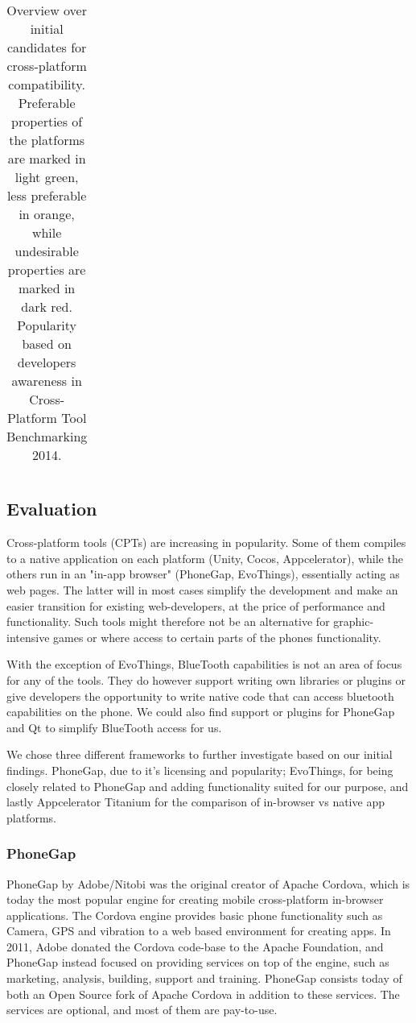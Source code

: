 \begin{landscape}
\begin{table}[ht]
\begin{minipage}{\textwidth}
\begin{tabular}{llllll}
\end{tabular}
\caption {Overview over initial candidates for cross-platform compatibility. Preferable properties of the platforms are marked in light green, less preferable in orange, while undesirable properties are marked in dark red. Popularity based on developers awareness in Cross-Platform Tool Benchmarking 2014\cite{research2guidance_cpt_benchmark2014}.}
\end{minipage}
\end{table}
\end{landscape}

\subsection{Evaluation}
Cross-platform tools (CPTs) are increasing in popularity. Some of them compiles to a native application on each platform (Unity, Cocos, Appcelerator), while the others run in an "in-app browser" (PhoneGap, EvoThings), essentially acting as web pages. The latter will in most cases simplify the development and make an easier transition for existing web-developers, at the price of performance and functionality. Such tools might therefore not be an alternative for graphic-intensive games or where access to certain parts of the phones functionality. 

With the exception of EvoThings, BlueTooth capabilities is not an area of focus for any of the tools. They do however support writing own libraries or plugins or give developers the opportunity to write native code that can access bluetooth capabilities on the phone. We could also find support or plugins for PhoneGap and Qt to simplify BlueTooth access for us.

We chose three different frameworks to further investigate based on our initial findings. PhoneGap, due to it's licensing and popularity; EvoThings, for being closely related to PhoneGap and adding functionality suited for our purpose, and lastly Appcelerator Titanium for the comparison of in-browser vs native app platforms.

\subsubsection{PhoneGap}
PhoneGap by Adobe/Nitobi was the original creator of Apache Cordova, which is today the most popular engine for creating mobile cross-platform in-browser applications. The Cordova engine provides basic phone functionality such as Camera, GPS and vibration to a web based environment for creating apps. In 2011, Adobe donated the Cordova code-base to the Apache Foundation, and PhoneGap instead focused on providing services on top of the engine, such as marketing, analysis, building, support and training. PhoneGap consists today of both an Open Source fork of Apache Cordova in addition to these services. The services are optional, and most of them are pay-to-use.

